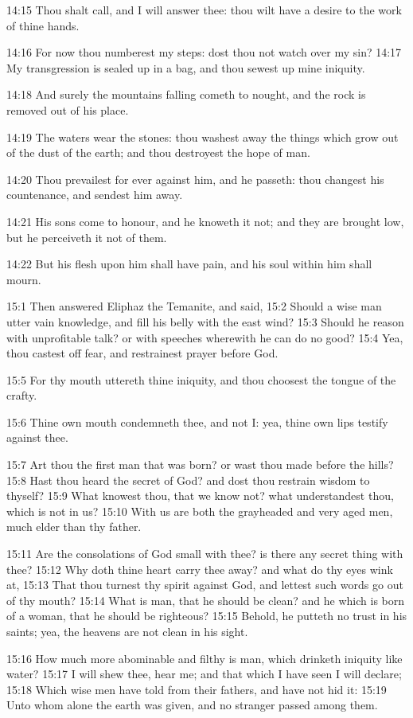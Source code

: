 14:15 Thou shalt call, and I will answer thee: thou wilt have a desire
to the work of thine hands.

14:16 For now thou numberest my steps: dost thou not watch over my
sin?  14:17 My transgression is sealed up in a bag, and thou sewest up
mine iniquity.

14:18 And surely the mountains falling cometh to nought, and the rock
is removed out of his place.

14:19 The waters wear the stones: thou washest away the things which
grow out of the dust of the earth; and thou destroyest the hope of
man.

14:20 Thou prevailest for ever against him, and he passeth: thou
changest his countenance, and sendest him away.

14:21 His sons come to honour, and he knoweth it not; and they are
brought low, but he perceiveth it not of them.

14:22 But his flesh upon him shall have pain, and his soul within him
shall mourn.

15:1 Then answered Eliphaz the Temanite, and said, 15:2 Should a wise
man utter vain knowledge, and fill his belly with the east wind?  15:3
Should he reason with unprofitable talk? or with speeches wherewith he
can do no good?  15:4 Yea, thou castest off fear, and restrainest
prayer before God.

15:5 For thy mouth uttereth thine iniquity, and thou choosest the
tongue of the crafty.

15:6 Thine own mouth condemneth thee, and not I: yea, thine own lips
testify against thee.

15:7 Art thou the first man that was born? or wast thou made before
the hills?  15:8 Hast thou heard the secret of God? and dost thou
restrain wisdom to thyself?  15:9 What knowest thou, that we know not?
what understandest thou, which is not in us?  15:10 With us are both
the grayheaded and very aged men, much elder than thy father.

15:11 Are the consolations of God small with thee? is there any secret
thing with thee?  15:12 Why doth thine heart carry thee away? and what
do thy eyes wink at, 15:13 That thou turnest thy spirit against God,
and lettest such words go out of thy mouth?  15:14 What is man, that
he should be clean? and he which is born of a woman, that he should be
righteous?  15:15 Behold, he putteth no trust in his saints; yea, the
heavens are not clean in his sight.

15:16 How much more abominable and filthy is man, which drinketh
iniquity like water?  15:17 I will shew thee, hear me; and that which
I have seen I will declare; 15:18 Which wise men have told from their
fathers, and have not hid it: 15:19 Unto whom alone the earth was
given, and no stranger passed among them.


